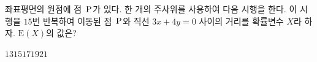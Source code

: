 좌표평면의 원점에 점~$\mathrm{P}$가 있다. 한 개의 주사위를 사용하여 다음 시행을 한다. \noindent 이 시행을 $15$번 반복하여 이동된 점~$\mathrm{P}$와 직선 $3x+4y=0$ 사이의 거리를 확률변수 $X$라 하자. $\mathrm{E}(X)$의 값은?
\begin{choices32}{$13$}{$15$}{$17$}{$19$}{$21$}\end{choices32}

